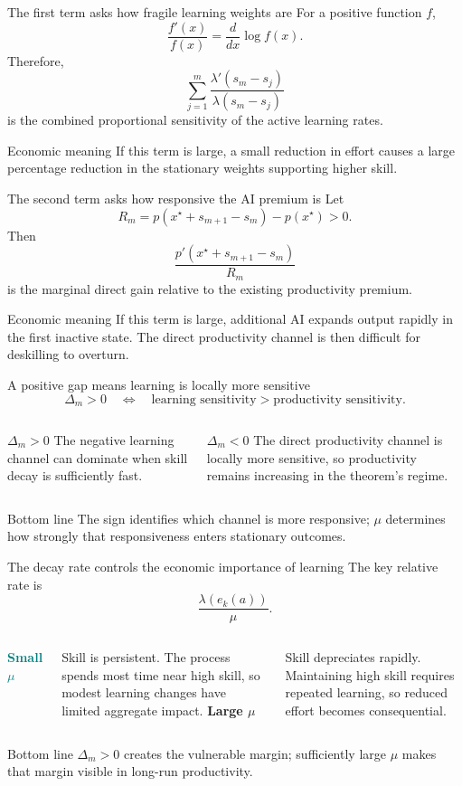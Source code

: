 \documentclass[aspectratio=169,11pt]{beamer}
\newcommand{\key}[1]{\textcolor{teal}{\textbf{#1}}}
\newcommand{\warning}[1]{\textcolor{rose}{\textbf{#1}}}
\newcommand{\econmeaning}[1]{%
  \begin{block}{Economic meaning}
  #1
  \end{block}}
\newcommand{\bottomline}[1]{%
  \begin{alertblock}{Bottom line}
  #1
  \end{alertblock}}
\begin{document}
\begin{frame}{The first term asks how fragile learning weights are}
For a positive function $f$,
\[
\frac{f'(x)}{f(x)}=\frac{d}{dx}\log f(x).
\]
Therefore,
\[
\sum_{j=1}^{m}\frac{\lambda'(s_m-s_j)}{\lambda(s_m-s_j)}
\]
is the combined proportional sensitivity of the active learning rates.
\econmeaning{If this term is large, a small reduction in effort causes a large percentage reduction in the stationary weights supporting higher skill.}
\end{frame}

\begin{frame}{The second term asks how responsive the AI premium is}
Let
\[
R_m=p(x^\star+s_{m+1}-s_m)-p(x^\star)>0.
\]
Then
\[
\frac{p'(x^\star+s_{m+1}-s_m)}{R_m}
\]
is the marginal direct gain relative to the existing productivity premium.
\econmeaning{If this term is large, additional AI expands output rapidly in the first inactive state. The direct productivity channel is then difficult for deskilling to overturn.}
\end{frame}

\begin{frame}{A positive gap means learning is locally more sensitive}
\[
\boxed{\Delta_m>0
\quad\Longleftrightarrow\quad
\text{learning sensitivity}>
\text{productivity sensitivity}.}
\]
\begin{columns}[T,onlytextwidth]
\begin{block}{$\Delta_m>0$}
The negative learning channel can dominate when skill decay is sufficiently fast.
\end{block}
\begin{exampleblock}{$\Delta_m<0$}
The direct productivity channel is locally more sensitive, so productivity remains increasing in the theorem's regime.
\end{exampleblock}
\end{columns}
\bottomline{The sign identifies which channel is more responsive; $\mu$ determines how strongly that responsiveness enters stationary outcomes.}
\end{frame}

\begin{frame}{The decay rate controls the economic importance of learning}
The key relative rate is
\[
\frac{\lambda(e_k(a))}{\mu}.
\]
\begin{columns}[T,onlytextwidth]
\key{Small $\mu$}

Skill is persistent. The process spends most time near high skill, so modest learning changes have limited aggregate impact.
\warning{Large $\mu$}

Skill depreciates rapidly. Maintaining high skill requires repeated learning, so reduced effort becomes consequential.
\end{columns}
\bottomline{$\Delta_m>0$ creates the vulnerable margin; sufficiently large $\mu$ makes that margin visible in long-run productivity.}
\end{frame}
\end{document}
